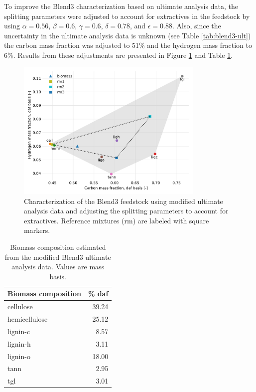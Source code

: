 To improve the Blend3 characterization based on ultimate analysis data, the splitting parameters were adjusted to account for extractives in the feedstock by using $\alpha = 0.56$, $\beta = 0.6$, $\gamma = 0.6$, $\delta = 0.78$, and $\epsilon = 0.88$. Also, since the uncertainty in the ultimate analysis data is unknown (see Table \ref{tab:blend3-ult}) the carbon mass fraction was adjusted to 51\% and the hydrogen mass fraction to 6\%. Results from these adjustments are presented in Figure \ref{fig:blend3-biocharact-ultmod} and Table \ref{tab:blend3-biocomp-ultmod}.

\begin{figure}[H]
    \centering
    \includegraphics[width=0.8\textwidth]{figures/blend3-biocharact-ultmod.pdf}
    \caption{Characterization of the Blend3 feedstock using modified ultimate analysis data and adjusting the splitting parameters to account for extractives. Reference mixtures (rm) are labeled with square markers.}
    \label{fig:blend3-biocharact-ultmod}
\end{figure}

\begin{table}[H]
    \centering
    \caption{Biomass composition estimated from the modified Blend3 ultimate analysis data. Values are mass basis.}
    \label{tab:blend3-biocomp-ultmod}
    \begin{tabular}{lr}
        \toprule
        Biomass composition & \% daf \\
        \midrule
        cellulose     & 39.24 \\
        hemicellulose & 25.12 \\
        lignin-c      & 8.57  \\
        lignin-h      & 3.11  \\
        lignin-o      & 18.00 \\
        tann          & 2.95  \\
        tgl           & 3.01  \\
        \bottomrule
    \end{tabular}
\end{table}

